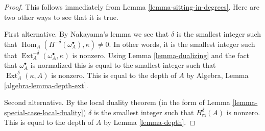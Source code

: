 \documentclass[10pt,a4paper]{amsart}
\theoremstyle{plain}
\theoremstyle{definition}
\theoremstyle{remark}
\numberwithin{equation}{subsection}
\def\Hom{\mathop{\mathrm{Hom}}\nolimits}
\def\Ext{\mathop{\mathrm{Ext}}\nolimits}
\begin{document}
\begin{proof}
This follows immediately from
Lemma \ref{lemma-sitting-in-degrees}.
Here are two other ways to see that it is true.

\medskip\noindent
First alternative. By Nakayama's lemma we see that
$\delta$ is the smallest integer such that
$\Hom_A(H^{-\delta}(\omega_A^\bullet), \kappa) \not = 0$.
In other words, it is the smallest integer such that
$\Ext_A^{-\delta}(\omega_A^\bullet, \kappa)$
is nonzero. Using Lemma \ref{lemma-dualizing} and the fact that
$\omega_A^\bullet$ is normalized this is equal to the
smallest integer such that $\Ext_A^\delta(\kappa, A)$ is
nonzero. This is equal to the depth of $A$ by
Algebra, Lemma \ref{algebra-lemma-depth-ext}.

\medskip\noindent
Second alternative. By the local duality theorem
(in the form of Lemma \ref{lemma-special-case-local-duality})
$\delta$ is the smallest integer such that $H^\delta_\mathfrak m(A)$
is nonzero. This is equal to the depth of $A$ by
Lemma \ref{lemma-depth}.
\end{proof}
\end{document}
